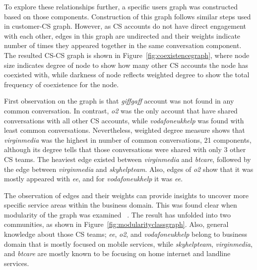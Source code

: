 \documentclass[sigconf]{acmart}
\begin{document}
To explore these relationships further, a specific users graph was constructed 
based on those components. Construction of this graph follows similar steps used in 
customer-CS graph. However, as CS accounts do not have direct engagement 
with each other, edges in this graph are undirected and their weights indicate number 
of times they appeared together in the same conversation component. 
The resulted CS-CS graph is shown in Figure~\ref{fig:coexistencegraph}, where 
node size indicates degree of node to show how many other CS accounts the node 
has coexisted with, while darkness of node reflects weighted degree to show the 
total frequency of coexistence for the node.   

First observation on the graph is that {\emph{giffgaff}} account was not found in 
any common conversation. In contrast, {\emph{o2}} was the only account
that have shared conversations with all other CS accounts, while
{\emph{vodafoneukhelp}} was found with least common
conversations. Nevertheless, weighted degree measure shows that
{\emph{virginmedia}} was the highest in number of common
conversations, 21 components, although its degree tells that those 
conversations were shared with only 3 other CS teams. The heaviest edge
existed between {\emph{virginmedia}} and {\emph{btcare}}, followed by
the edge between {\emph{virginmedia}} and {\emph{skyhelpteam}}. Also,
edges of {\emph{o2}} show that it was mostly appeared with
{\emph{ee}}, and for {\emph{vodafoneukhelp}} it was {\emph{ee}}.

The observation of edges and their weights can provide insights to
uncover more specific service areas within the business domain. This
was found clear when modularity of the graph was examined ~\cite{Blondel2008}. The result
has unfolded into two communities, as shown in
Figure~\ref{fig:modularityclassgraph}. Also, general knowledge about
those CS teams; {\emph{ee}}, {\emph{o2}}, and {\emph{vodafoneukhelp}}
belong to business domain that is mostly focused on mobile services,
while {\emph{skyhelpteam}}, {\emph{virginmedia}}, and {\emph{btcare}}
are mostly known to be focusing on home internet and landline
services.
\end{document}
